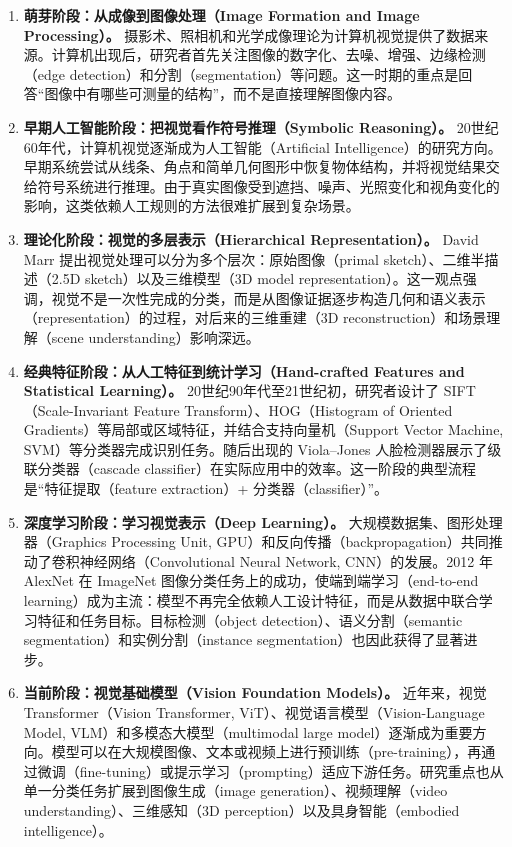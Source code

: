 \begin{enumerate}[label=\arabic*.]
    \item \textbf{萌芽阶段：从成像到图像处理（Image Formation and Image Processing）。}
    摄影术、照相机和光学成像理论为计算机视觉提供了数据来源。计算机出现后，研究者首先关注图像的数字化、去噪、增强、边缘检测（edge detection）和分割（segmentation）等问题。这一时期的重点是回答“图像中有哪些可测量的结构”，而不是直接理解图像内容。

    \item \textbf{早期人工智能阶段：把视觉看作符号推理（Symbolic Reasoning）。}
    20世纪60年代，计算机视觉逐渐成为人工智能（Artificial Intelligence）的研究方向。早期系统尝试从线条、角点和简单几何图形中恢复物体结构，并将视觉结果交给符号系统进行推理。由于真实图像受到遮挡、噪声、光照变化和视角变化的影响，这类依赖人工规则的方法很难扩展到复杂场景。

    \item \textbf{理论化阶段：视觉的多层表示（Hierarchical Representation）。}
    David Marr 提出视觉处理可以分为多个层次：原始图像（primal sketch）、二维半描述（2.5D sketch）以及三维模型（3D model representation）。这一观点强调，视觉不是一次性完成的分类，而是从图像证据逐步构造几何和语义表示（representation）的过程，对后来的三维重建（3D reconstruction）和场景理解（scene understanding）影响深远。

    \item \textbf{经典特征阶段：从人工特征到统计学习（Hand-crafted Features and Statistical Learning）。}
    20世纪90年代至21世纪初，研究者设计了 SIFT（Scale-Invariant Feature Transform）、HOG（Histogram of Oriented Gradients）等局部或区域特征，并结合支持向量机（Support Vector Machine, SVM）等分类器完成识别任务。随后出现的 Viola--Jones 人脸检测器展示了级联分类器（cascade classifier）在实际应用中的效率。这一阶段的典型流程是“特征提取（feature extraction）+ 分类器（classifier）”。

    \item \textbf{深度学习阶段：学习视觉表示（Deep Learning）。}
    大规模数据集、图形处理器（Graphics Processing Unit, GPU）和反向传播（backpropagation）共同推动了卷积神经网络（Convolutional Neural Network, CNN）的发展。2012 年 AlexNet 在 ImageNet 图像分类任务上的成功，使端到端学习（end-to-end learning）成为主流：模型不再完全依赖人工设计特征，而是从数据中联合学习特征和任务目标。目标检测（object detection）、语义分割（semantic segmentation）和实例分割（instance segmentation）也因此获得了显著进步。

    \item \textbf{当前阶段：视觉基础模型（Vision Foundation Models）。}
    近年来，视觉 Transformer（Vision Transformer, ViT）、视觉语言模型（Vision-Language Model, VLM）和多模态大模型（multimodal large model）逐渐成为重要方向。模型可以在大规模图像、文本或视频上进行预训练（pre-training），再通过微调（fine-tuning）或提示学习（prompting）适应下游任务。研究重点也从单一分类任务扩展到图像生成（image generation）、视频理解（video understanding）、三维感知（3D perception）以及具身智能（embodied intelligence）。
\end{enumerate}

